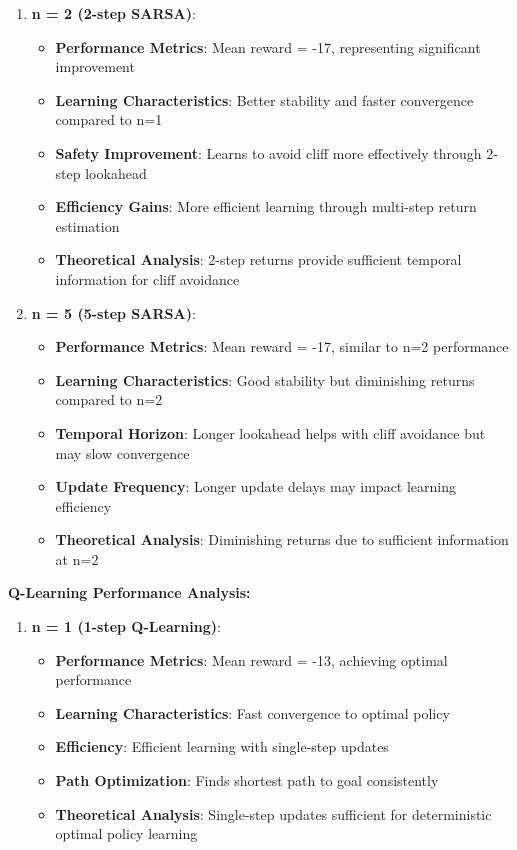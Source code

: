 \documentclass[12pt]{article}
\begin{document}
{{{\begin{enumerate}
    \item \textbf{n = 2 (2-step SARSA)}:
    \begin{itemize}
        \item \textbf{Performance Metrics}: Mean reward = -17, representing significant improvement
        \item \textbf{Learning Characteristics}: Better stability and faster convergence compared to n=1
        \item \textbf{Safety Improvement}: Learns to avoid cliff more effectively through 2-step lookahead
        \item \textbf{Efficiency Gains}: More efficient learning through multi-step return estimation
        \item \textbf{Theoretical Analysis}: 2-step returns provide sufficient temporal information for cliff avoidance
    \end{itemize}
    
    \item \textbf{n = 5 (5-step SARSA)}:
    \begin{itemize}
        \item \textbf{Performance Metrics}: Mean reward = -17, similar to n=2 performance
        \item \textbf{Learning Characteristics}: Good stability but diminishing returns compared to n=2
        \item \textbf{Temporal Horizon}: Longer lookahead helps with cliff avoidance but may slow convergence
        \item \textbf{Update Frequency}: Longer update delays may impact learning efficiency
        \item \textbf{Theoretical Analysis}: Diminishing returns due to sufficient information at n=2
    \end{itemize}
\end{enumerate}

\textbf{Q-Learning Performance Analysis:}

\begin{enumerate}
    \item \textbf{n = 1 (1-step Q-Learning)}:
    \begin{itemize}
        \item \textbf{Performance Metrics}: Mean reward = -13, achieving optimal performance
        \item \textbf{Learning Characteristics}: Fast convergence to optimal policy
        \item \textbf{Efficiency}: Efficient learning with single-step updates
        \item \textbf{Path Optimization}: Finds shortest path to goal consistently
        \item \textbf{Theoretical Analysis}: Single-step updates sufficient for deterministic optimal policy learning
    \end{itemize}
    

\end{enumerate}}}}
\end{document}
